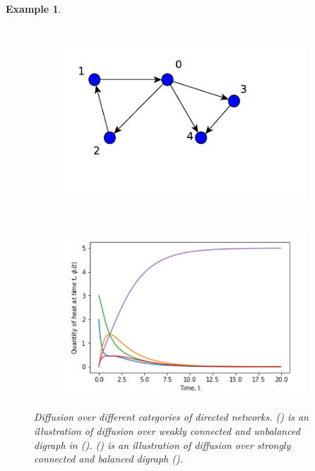 \documentclass[10pt,a4paper]{article}
\newtheorem{exa}{Example}
\begin{document}
\begin{exa}
\begin{figure}[H]
\begin{subfigure}[b]{0.5\textwidth}
      	    \end{subfigure} \\
            \begin{subfigure}[b]{0.40\textwidth}
            	\includegraphics[width=\textwidth]{images/UnbalanceDigraph.pdf}
            	\caption{}
            	\label{unbalanced-graph}
            \end{subfigure}~
            \begin{subfigure}[b]{0.5\textwidth}
            	\includegraphics[width= \textwidth]{images/non-balnceddigraph-difusion.png}
            	\caption{}
            	\label{plot-unbalanced}
            \end{subfigure}
      		\caption{Diffusion over different categories of directed networks. () is an illustration of diffusion over weakly connected and unbalanced digraph in (). () is an illustration of diffusion over strongly connected and balanced digraph ().  }  

\end{figure}
\end{exa}
\end{document}
